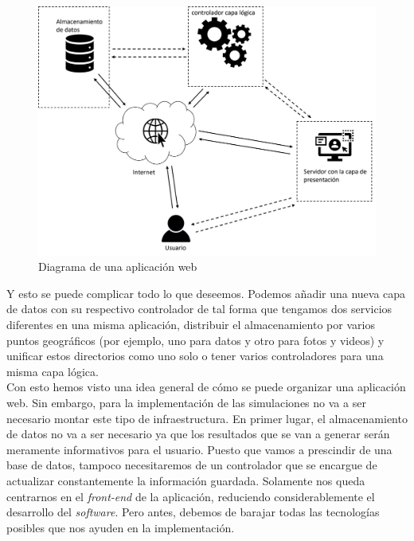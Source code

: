 \documentclass[../main.tex]{subfiles}
\begin{document}
    \begin{figure}[!h]
          \centering
          \includegraphics[width=\textwidth]{images/despliegue_web.png}
          \caption{Diagrama de una aplicación web}
          \label{fig:web_despliegue}
      \end{figure}
    
    Y esto se puede complicar todo lo que deseemos. Podemos añadir una nueva capa de datos con su respectivo controlador de tal forma que tengamos dos servicios diferentes en una misma aplicación, distribuir el almacenamiento por varios puntos geográficos (por ejemplo, uno para datos y otro para fotos y videos) y unificar estos directorios como uno solo o tener varios controladores para una misma capa lógica.\\
    
    
    Con esto hemos visto una idea general de cómo se puede organizar una aplicación web. Sin embargo, para la implementación de las simulaciones no va a ser necesario montar este tipo de infraestructura. En primer lugar, el almacenamiento de datos no va a ser necesario ya que los resultados que se van a generar serán meramente informativos para el usuario. Puesto que vamos a prescindir de una base de datos, tampoco necesitaremos de un controlador que se encargue de actualizar constantemente la información guardada. Solamente nos queda centrarnos en el \textit{front-end} de la aplicación, reduciendo considerablemente el desarrollo del \textit{software}. Pero antes, debemos de barajar todas las tecnologías posibles que nos ayuden en la implementación.
    
    
\end{document}
